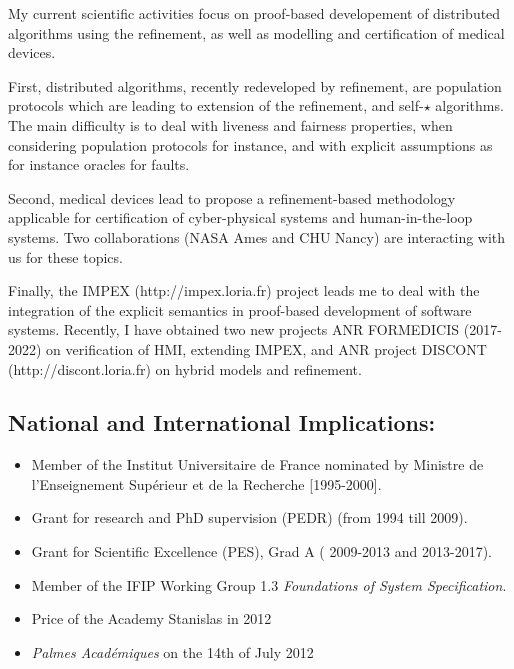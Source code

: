 \documentclass[ 12pt]{article}
\begin{document}
  My current  scientific activities focus  on proof-based developement
  of distributed  algorithms  using    the refinement, as     well as
  modelling and certification of medical devices.

  First, distributed  algorithms,  recently redeveloped by refinement,
  are population protocols  which  are  leading  to extension  of  the
  refinement,  and self-$\star$ algorithms. The  main difficulty is to
  deal    with liveness   and   fairness properties,  when  considering
  population protocols for  instance, and with explicit assumptions as for instance 
  oracles for faults.

  Second,   medical  devices  lead  to propose a  refinement-based methodology
  applicable  for   certification    of  cyber-physical  systems   and
  human-in-the-loop  systems.  Two   collaborations (NASA Ames and  CHU
  Nancy) are interacting with us for these topics.



Finally, the IMPEX (http://impex.loria.fr) project leads me to deal with the integration of
the explicit semantics in  proof-based development of software
systems. Recently, I have obtained two new projects ANR FORMEDICIS
(2017-2022) on verification of HMI, extending IMPEX, and ANR project
DISCONT (http://discont.loria.fr)  on hybrid models and  refinement.






\subsection{National and International Implications:}



\begin{itemize}
\item Member of the Institut Universitaire
de France nominated by   Ministre de l'Enseignement Sup\'erieur et de la Recherche [1995-2000].
\item  Grant for research and PhD supervision (PEDR) (from 1994  till  2009).
\item  Grant for Scientific Excellence (PES), Grad A  ( 2009-2013  and  2013-2017).
\item Member of the IFIP Working Group  1.3  \textit{Foundations of System Specification}.
\item Price of the Academy Stanislas in 2012

\item \textit{Palmes Acad\'emiques} on the  14th of  July  2012

\end{itemize}
\end{document}
